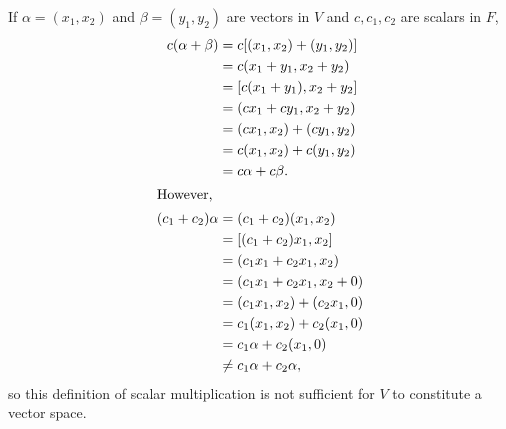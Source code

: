 \documentclass[12pt]{article}
\begin{document}
\begin{enumerate}
    If $\alpha = (x_1,x_2)$ and $\beta = (y_1,y_2)$ are vectors in $V$ and
    $c,c_1,c_2$ are scalars in $F$,
    \begin{align*}
      c(\alpha + \beta) &= c[(x_1,x_2) + (y_1,y_2)]\\
                        &= c(x_1 + y_1,x_2 + y_2)\\
                        &= [c(x_1 + y_1),x_2 + y_2]\\
                        &= (cx_1 + cy_1,x_2 + y_2)\\
                        &= (cx_1,x_2) + (cy_1,y_2)\\
                        &= c(x_1,x_2) + c(y_1,y_2)\\
                        &= c\alpha + c\beta.\\
      \shortintertext{However,}
      (c_1 + c_2)\alpha &= (c_1 + c_2)(x_1,x_2)\\
                        &= [(c_1 + c_2)x_1,x_2]\\
                        &= (c_1x_1 + c_2x_1,x_2)\\
                        &= (c_1x_1 + c_2x_1,x_2 + 0)\\
                        &= (c_1x_1,x_2) + (c_2x_1,0)\\
                        &= c_1(x_1,x_2) + c_2(x_1,0)\\
                        &= c_1\alpha + c_2(x_1,0)\\
                        &\neq c_1\alpha + c_2\alpha,
    \end{align*}
    so this definition of scalar multiplication is not sufficient for $V$ to
    constitute a vector space.

\end{enumerate}
\end{document}
